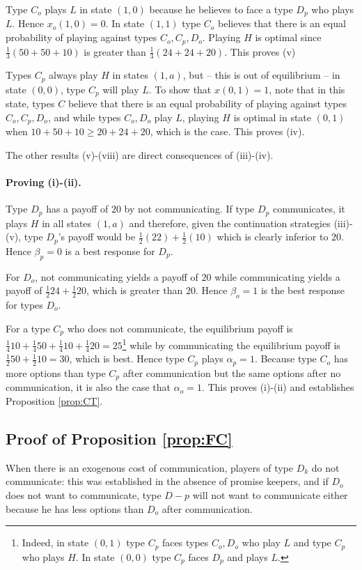 \documentclass[12pt]{article}
\theoremstyle{break}
\begin{document}
Type $C_o$ plays $L$ in state $(1,0)$ because he believes to face a type $D_p$ who plays $L$. Hence $x_o(1,0)=0$. In state $(1,1)$ type $C_o$ believes that there is an equal probability of playing against types $C_o,C_p,D_o$. Playing $H$ is optimal since $\frac{1}{3}(50+50+10)$ is greater than $\frac{1}{3}(24+24+20)$. This proves (v)

Types $C_p$ always play $H$ in states $(1,a)$, but -- this is out of equilibrium -- in state $(0,0)$, type $C_p$ will play $L$. To show that $x(0,1)=1$, note that in this state, types $C$ believe that  there is an equal probability of playing against types $C_o,C_p,D_o$, and while types $C_o,D_o$ play $L$, playing $H$ is optimal in state $(0,1)$ when $10+50+10\geq 20+24+20$, which is the case. This proves (iv).

The other results (v)-(viii) are direct consequences of (iii)-(iv).

\paragraph{Proving (i)-(ii).} Type $D_p$ has a payoff of $20$ by not communicating. If type $D_p$ communicates, it plays $H$ in all states $(1,a)$ and therefore, given the continuation strategies (iii)-(v), type $D_p$'s payoff would be $\frac{1}{2}(22)+\frac{1}{2}(10)$ which is clearly inferior to $20$. Hence $\beta_p=0$ is a best response for $D_p$.

For $D_o$, not communicating yields a payoff of $20$ while communicating yields a payoff of $\frac{1}{2}24+\frac{1}{2}20$, which is greater than $20$. Hence $\beta_o=1$ is the best response for types $D_o$.

For a type $C_p$ who does not communicate, the equilibrium payoff is $ \frac{1}{4}10+\frac{1}{4}50+\frac{1}{4}10+\frac{1}{4}20=25$\footnote{
Indeed, in state $(0,1)$ type $C_p$ faces types $C_o,D_o$ who play $L$	and type $C_p$ who plays $H$. In state $(0,0)$ type $C_p$ faces $D_p$ and plays $L$.
} while by communicating the equilibrium payoff is $\frac{1}{2}50+\frac{1}{2}10=30$, which is best. Hence type $C_p$ plays $\alpha_p=1$. Because type $C_o$ has more options than type $C_p$ after communication but the same options after no communication, it is also the case that $\alpha_o=1$. This proves (i)-(ii) and establishes Proposition \ref{prop:CT}.



%
%
%   
%    

\subsection*{Proof of Proposition \ref{prop:FC}}
When there is an exogenous cost of communication, players of type $D_k$ do not communicate: this was established in the absence of promise keepers, and if $D_o$ does not want to communicate, type $D-p$ will not want to communicate either because he has less options than $D_o$ after communication. 
\end{document}
